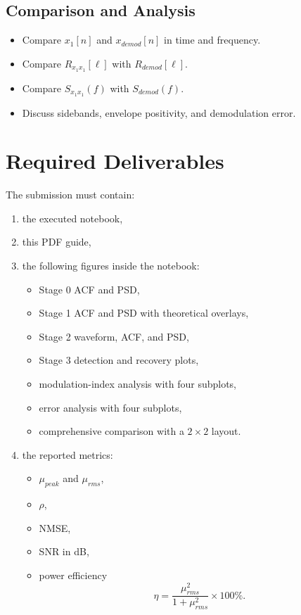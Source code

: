 \documentclass[11pt,a4paper]{article}
\begin{document}
\subsection*{Comparison and Analysis}
\begin{itemize}[leftmargin=1.5em]
  \item Compare $x_1[n]$ and $x_{demod}[n]$ in time and frequency.
  \item Compare $R_{x_1x_1}[\ell]$ with $R_{demod}[\ell]$.
  \item Compare $S_{x_1x_1}(f)$ with $S_{demod}(f)$.
  \item Discuss sidebands, envelope positivity, and demodulation error.
\end{itemize}

\section*{Required Deliverables}
The submission must contain:
\begin{enumerate}[leftmargin=1.5em]
  \item the executed notebook,
  \item this PDF guide,
  \item the following figures inside the notebook:
  \begin{itemize}[leftmargin=1.5em]
    \item Stage 0 ACF and PSD,
    \item Stage 1 ACF and PSD with theoretical overlays,
    \item Stage 2 waveform, ACF, and PSD,
    \item Stage 3 detection and recovery plots,
    \item modulation-index analysis with four subplots,
    \item error analysis with four subplots,
    \item comprehensive comparison with a $2\times2$ layout.
  \end{itemize}
  \item the reported metrics:
  \begin{itemize}[leftmargin=1.5em]
    \item $\mu_{peak}$ and $\mu_{rms}$,
    \item $\rho$,
    \item NMSE,
    \item SNR in dB,
    \item power efficiency
    \[
      \eta = \frac{\mu_{rms}^2}{1 + \mu_{rms}^2} \times 100\%.
    \]
  \end{itemize}
\end{enumerate}
\end{document}
